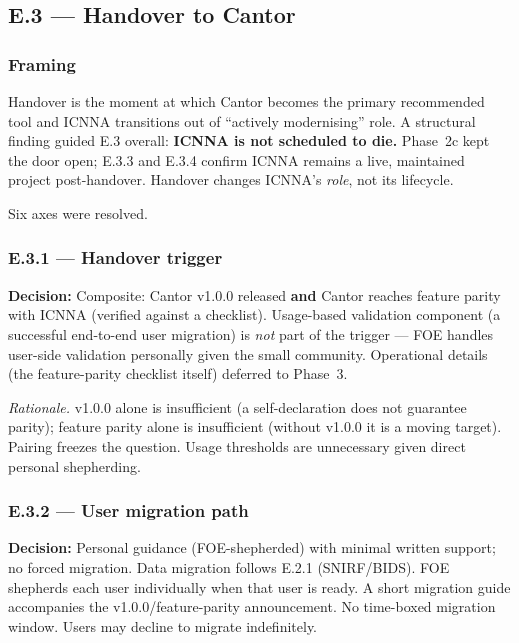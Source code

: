 \documentclass[11pt,a4paper]{article}
\begin{document}
\subsection{E.3 --- Handover to Cantor}

\subsubsection{Framing}

Handover is the moment at which Cantor becomes the primary recommended tool and ICNNA transitions out of ``actively modernising'' role. A structural finding guided E.3 overall: \textbf{ICNNA is not scheduled to die.} Phase~2c kept the door open; E.3.3 and E.3.4 confirm ICNNA remains a live, maintained project post-handover. Handover changes ICNNA's \emph{role}, not its lifecycle.

Six axes were resolved.

\subsubsection{E.3.1 --- Handover trigger}

\textbf{Decision:} Composite: Cantor v1.0.0 released \textbf{and} Cantor reaches feature parity with ICNNA (verified against a checklist). Usage-based validation component (a successful end-to-end user migration) is \emph{not} part of the trigger --- FOE handles user-side validation personally given the small community. Operational details (the feature-parity checklist itself) deferred to Phase~3.

\textit{Rationale.} v1.0.0 alone is insufficient (a self-declaration does not guarantee parity); feature parity alone is insufficient (without v1.0.0 it is a moving target). Pairing freezes the question. Usage thresholds are unnecessary given direct personal shepherding.

\subsubsection{E.3.2 --- User migration path}

\textbf{Decision:} Personal guidance (FOE-shepherded) with minimal written support; no forced migration. Data migration follows E.2.1 (SNIRF/BIDS). FOE shepherds each user individually when that user is ready. A short migration guide accompanies the v1.0.0/feature-parity announcement. No time-boxed migration window. Users may decline to migrate indefinitely.
\end{document}
